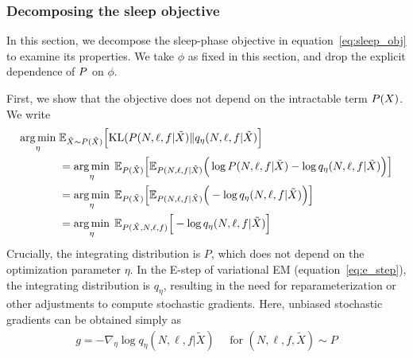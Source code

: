 
\subsubsection{Decomposing the sleep objective}
\label{sec:sleep_details}
In this section, we decompose the sleep-phase objective in equation~\eqref{eq:sleep_obj} to examine its properties. We take $\phi$ as fixed in this section, and drop the explicit dependence of $P$ on $\phi$.

First, we show that the objective does not depend on the intractable term $P(X)$. 
We write
\begin{align}
 \operatorname*{arg\,min}_{\eta} \; & \mathbb{E}_{\tilde X \sim P(\tilde X)}\Big[ \mathrm{KL}(P(N, \ell, f | \tilde X) \| q_\eta(N, \ell, f | \tilde X)\Big] \\
  &=\operatorname*{arg\,min}_{\eta} \; \mathbb E_{P(\tilde X)}\Big[\mathbb E_{P(N, \ell, f | \tilde X)}\Big(\log P(N, \ell, f | \tilde X) - \log q_\eta(N, \ell, f | \tilde X) \Big)\Big]\\
&=\operatorname*{arg\,min}_{\eta} \; \mathbb E_{P(\tilde X)}\Big[\mathbb E_{P(N, \ell, f | \tilde X)}\Big( - \log q_\eta(N, \ell, f | \tilde X) \Big)\Big]\\
&=\operatorname*{arg\,min}_{\eta} \; \mathbb E_{P(\tilde X, N, \ell, f)}\Big[- \log q_\eta(N, \ell, f | \tilde X) \Big]\label{eq:sleep_loss_simple}
\end{align}
Crucially, the integrating distribution is $P$, which does not depend on the optimization parameter $\eta$.
In the E-step of variational EM (equation~\eqref{eq:e_step}), the integrating distribution is $q_\eta$, resulting in the need for reparameterization or other adjustments to compute stochastic gradients. 
Here, unbiased stochastic gradients can be obtained simply as 
\begin{align}
    g = -\nabla_\eta \log q_\eta(N, \ell, f | \tilde X) \quad \text{ for } (N, \ell, f, \tilde X)\sim P
\end{align}

